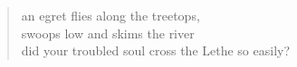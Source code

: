 
\begin{verse}
an egret flies along the treetops, \\
swoops low and skims the river \\
did your troubled soul cross the Lethe so easily? 
\end{verse}
